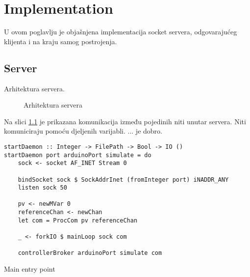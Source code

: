 \newpage
\chapter{Implementation}

U ovom poglavlju je objašnjena implementacija socket servera, odgovarajućeg
klijenta i na kraju samog postrojenja.

\newpage
\section{Server}

Arhitektura servera.

\begin{figure}[H]
\centering
{}
\caption{Arhitektura servera}
\label{fig:architecture}
\end{figure}

Na slici \ref{fig:architecture} je prikazana komunikacija između pojedinih niti
unutar servera. Niti komuniciraju pomoću djeljenih varijabli.
... je dobro.

\begin{listing}[H]
\centering
\begin{verbatim}
startDaemon :: Integer -> FilePath -> Bool -> IO ()
startDaemon port arduinoPort simulate = do
    sock <- socket AF_INET Stream 0

    bindSocket sock $ SockAddrInet (fromInteger port) iNADDR_ANY
    listen sock 50

    pv <- newMVar 0
    referenceChan <- newChan
    let com = ProcCom pv referenceChan

    _ <- forkIO $ mainLoop sock com

    controllerBroker arduinoPort simulate com
\end{verbatim}
\caption{Main entry point}
\label{lst:main}
\end{listing}

